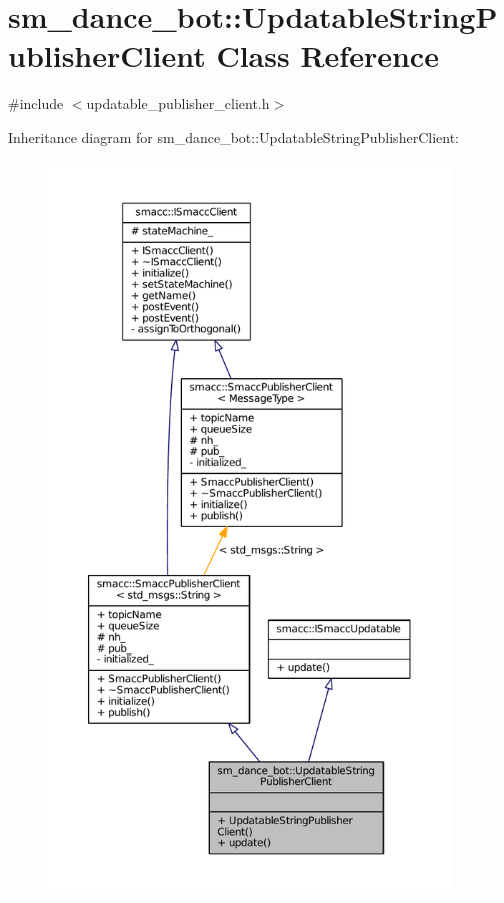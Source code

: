 \hypertarget{classsm__dance__bot_1_1UpdatableStringPublisherClient}{}\section{sm\+\_\+dance\+\_\+bot\+:\+:Updatable\+String\+Publisher\+Client Class Reference}
\label{classsm__dance__bot_1_1UpdatableStringPublisherClient}


{\ttfamily \#include $<$updatable\+\_\+publisher\+\_\+client.\+h$>$}



Inheritance diagram for sm\+\_\+dance\+\_\+bot\+:\+:Updatable\+String\+Publisher\+Client\+:
\nopagebreak
\begin{figure}[H]
\begin{center}
\leavevmode
\includegraphics[height=550pt]{classsm__dance__bot_1_1UpdatableStringPublisherClient__inherit__graph}
\end{center}
\end{figure}


